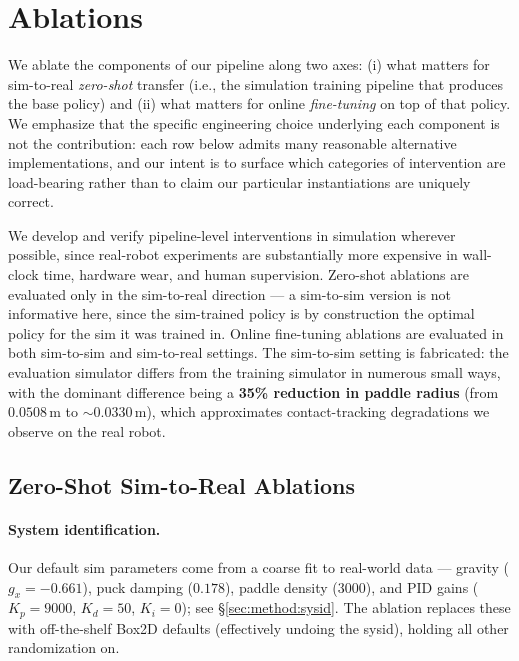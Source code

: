 \documentclass{article}
\begin{document}

\section{Ablations}
\label{sec:ablations}

    We ablate the components of our pipeline along two axes: (i) what matters for sim-to-real \emph{zero-shot} transfer (i.e., the simulation training pipeline that produces the base policy) and (ii) what matters for online \emph{fine-tuning} on top of that policy. We emphasize that the specific engineering choice underlying each component is not the contribution: each row below admits many reasonable alternative implementations, and our intent is to surface which categories of intervention are load-bearing rather than to claim our particular instantiations are uniquely correct.

    We develop and verify pipeline-level interventions in simulation wherever possible, since real-robot experiments are substantially more expensive in wall-clock time, hardware wear, and human supervision. Zero-shot ablations are evaluated only in the sim-to-real direction --- a sim-to-sim version is not informative here, since the sim-trained policy is by construction the optimal policy for the sim it was trained in. Online fine-tuning ablations are evaluated in both sim-to-sim and sim-to-real settings. The sim-to-sim setting is fabricated: the evaluation simulator differs from the training simulator in numerous small ways, with the dominant difference being a \textbf{35\% reduction in paddle radius} (from $0.0508$\,m to $\sim 0.0330$\,m), which approximates contact-tracking degradations we observe on the real robot.

\subsection{Zero-Shot Sim-to-Real Ablations}
\label{sec:ablations:zeroshot}

    \paragraph{System identification.} Our default sim parameters come from a coarse fit to real-world data --- gravity ($g_x = -0.661$), puck damping ($0.178$), paddle density ($3000$), and PID gains ($K_p{=}9000$, $K_d{=}50$, $K_i{=}0$); see \S\ref{sec:method:sysid}. The ablation replaces these with off-the-shelf Box2D defaults (effectively undoing the sysid), holding all other randomization on.
\end{document}
